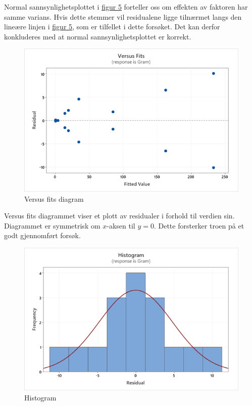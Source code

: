 \documentclass[12pt]{article}
\begin{document}
Normal sannsynlighetsplottet i \hyperref[fig:fig5]{figur 5} forteller oss om effekten av faktoren har samme varians. Hvis dette stemmer vil residualene ligge tilnærmet langs den lineære linjen i \hyperref[fig:fig5]{figur 5}, som er tilfellet i dette forsøket. Det kan derfor konkluderes med at normal sannsynlighetsplottet er korrekt.\cite{1}


\begin{figure}[H]
    \centering
    \includegraphics[width=\linewidth]{Figur 6.png}
    \caption{Versus fits diagram}
    \label{fig:fig6}
\end{figure}

Versus fits diagrammet viser et plott av residualer i forhold til verdien sin. Diagrammet er symmetrisk om $x$-aksen til $y=0$. Dette forsterker troen på et godt gjennomført forsøk.\cite{1}

\begin{figure}[H]
    \centering
    \includegraphics[width=\linewidth]{Figur 7.png}
    \caption{Histogram}
    \label{fig:fig7}
\end{figure}
\end{document}
